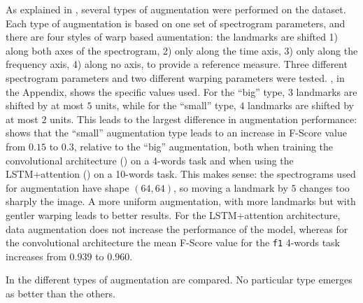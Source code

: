 As explained in , several types of augmentation
were performed on the dataset.
Each type of augmentation is based on one set of spectrogram parameters,
and there are four styles of warp based aumentation:
the landmarks are shifted
1) along both axes of the spectrogram,
2) only along the time axis,
3) only along the frequency axis,
4) along no axis, to provide a reference measure.
Three different spectrogram parameters and two different warping parameters
were tested.
, in the Appendix, shows the specific values used.
For the ``big'' type, $3$ landmarks are shifted by at most $5$ units,
while for the ``small'' type, $4$ landmarks are shifted by at most $2$ units.
This leads to the largest difference in augmentation performance:
 shows that the ``small'' augmentation
type leads to an increase in F-Score value from $0.15$ to $0.3$, relative to
the ``big'' augmentation, both when training the convolutional architecture
() on a 4-words task and when using the
LSTM+attention () on a 10-words task.
This makes sense: the spectrograms used for augmentation have shape 
$(64, 64)$,
so moving a landmark by $5$ changes too sharply the image.
A more uniform augmentation, with more landmarks but with 
gentler
warping leads to better results.
For the LSTM+attention architecture, data augmentation does not increase
the performance of the model,
whereas for the convolutional architecture the mean F-Score value for the 
\texttt{f1} 4-words task increases from $0.939$ to $0.960$.

In  the different types of
augmentation are compared.
No particular type emerges as better than the others.

